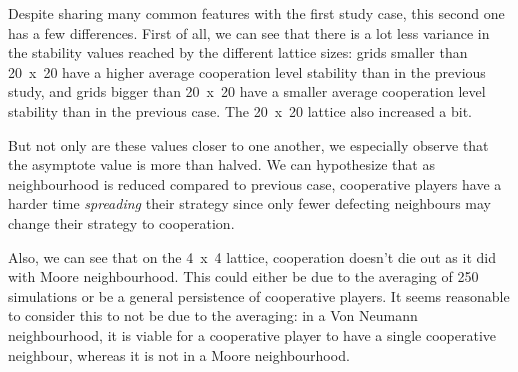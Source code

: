 \documentclass{article}
\begin{document}
Despite sharing many common features with the first study case, this second one has a few differences.
First of all, we can see that there is a lot less variance in the stability values reached by the different
lattice sizes: grids smaller than 20~x~20 have a higher average cooperation level stability than in the
previous study, and grids bigger than 20~x~20 have a smaller average cooperation level stability than
in the previous case. The 20~x~20 lattice also increased a bit.

But not only are these values closer to one another, we especially observe that the asymptote value is
more than halved. We can hypothesize that as neighbourhood is reduced compared to previous case, cooperative
players have a harder time \textit{spreading} their strategy since only fewer defecting neighbours may
change their strategy to cooperation.

Also, we can see that on the 4~x~4 lattice, cooperation doesn't die out as it did with Moore neighbourhood.
This could either be due to the averaging of 250 simulations or be a general persistence of cooperative
players. It seems reasonable to consider this to not be due to the averaging: in a Von Neumann neighbourhood,
it is viable for a cooperative player to have a single cooperative neighbour, whereas it is not in a
Moore neighbourhood.
\end{document}
